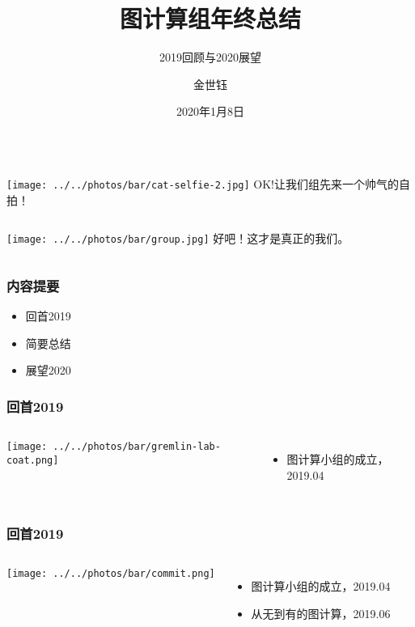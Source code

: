 \documentclass{beamer}
\title[总结]{图计算组年终总结}
\subtitle{2019回顾与2020展望}
\author{金世钰}
\date{2020年1月8日}
\begin{document}
\maketitle

  \begin{frame}
      \begin{columns}
       \texttt{[image: ../../photos/bar/cat-selfie-2.jpg]}
         OK!让我们组先来一个帅气的自拍！
      \end{columns}
  \end{frame}
  \begin{frame}
      \begin{columns}
       \texttt{[image: ../../photos/bar/group.jpg]}
        好吧！这才是真正的我们。
      \end{columns}
  \end{frame}

  \begin{frame}
  \frametitle{内容提要}
    \begin{itemize}
      \item{回首2019}
      \item{简要总结}
      \item{展望2020}
    \end{itemize}
  \end{frame}
  
  \begin{frame}
    \frametitle{回首2019}
  \begin{columns}
  \texttt{[image: ../../photos/bar/gremlin-lab-coat.png]}

  \begin{itemize}
  \item 图计算小组的成立，2019.04
  \end{itemize}
  \end{columns}

  \end{frame}
  
  \begin{frame}
    \frametitle{回首2019}
  \begin{columns}
  \texttt{[image: ../../photos/bar/commit.png]}

  \begin{itemize}
  \item 图计算小组的成立，2019.04
  \item 从无到有的图计算，2019.06
  \end{itemize}
  \end{columns}
  \end{frame}
\end{document}
